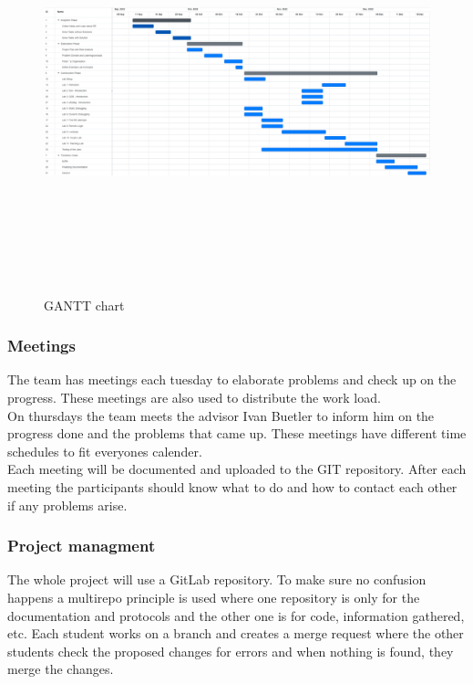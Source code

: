 \begin{figure}[H]
    \centering
    \begin{sideways}
    \includegraphics[width=600pt, height=330pt]{resources/gantt.png}
    \end{sideways}
    \caption{GANTT chart}
    \label{gantt_figure}
\end{figure}



\subsubsection*{Meetings}
The team has meetings each tuesday to elaborate problems and check up on the progress. These meetings are also used to distribute the work load. \\
On thursdays the team meets the advisor Ivan Buetler to inform him on the progress done and the problems that came up. These meetings have different time schedules to fit everyones calender. \\
Each meeting will be documented and uploaded to the GIT repository. After each meeting the participants should know what to do and how to contact each other if any problems arise.


\subsubsection*{Project managment}
The whole project will use a GitLab repository. To make sure no confusion happens a multirepo principle is used where one repository is only for the documentation and protocols and the other one is for code, information gathered, etc. Each student works on a branch and creates a merge request where the other students check the proposed changes for errors and when nothing is found, they merge the changes. 
